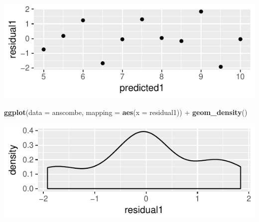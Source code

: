 \documentclass[]{article}
\newenvironment{Shaded}{\begin{snugshade}}{\end{snugshade}}
\newcommand{\KeywordTok}[1]{\textcolor[rgb]{0.13,0.29,0.53}{\textbf{{#1}}}}
\newcommand{\DataTypeTok}[1]{\textcolor[rgb]{0.13,0.29,0.53}{{#1}}}
\newcommand{\StringTok}[1]{\textcolor[rgb]{0.31,0.60,0.02}{{#1}}}
\newcommand{\NormalTok}[1]{{#1}}
\begin{document}
\begin{Shaded}
\end{Shaded}

\includegraphics{20180417_anscombe_residuals_files/figure-latex/unnamed-chunk-4-1.pdf}

\begin{Shaded}
\begin{Highlighting}[]
\KeywordTok{ggplot}\NormalTok{(}\DataTypeTok{data =} \NormalTok{anscombe, }\DataTypeTok{mapping =} \KeywordTok{aes}\NormalTok{(}\DataTypeTok{x =} \NormalTok{residual1)) +}
\StringTok{  }\KeywordTok{geom_density}\NormalTok{()}
\end{Highlighting}
\end{Shaded}

\includegraphics{20180417_anscombe_residuals_files/figure-latex/unnamed-chunk-5-1.pdf}
\end{document}

